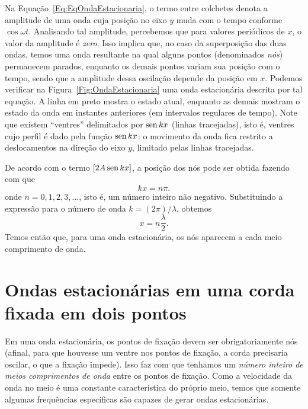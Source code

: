 \pagebreak

Na Equação~\eqref{Eq:EqOndaEstacionaria}, o termo entre colchetes denota a amplitude de uma onda cuja posição no eixo $y$ muda com o tempo conforme $\cos\omega t$. Analisando tal amplitude, percebemos que para valores periódicos de $x$, o valor da amplitude é \emph{zero}. Isso implica que, no caso da superposição das duas ondas, temos uma onda resultante na qual alguns pontos (denominados \emph{nós}) permanecem parados, enquanto os demais pontos variam sua posição com o tempo, sendo que a amplitude dessa oscilação depende da posição em $x$. Podemos verificar na Figura~\ref{Fig:OndaEstacionaria} uma onda estacionária descrita por tal equação. A linha em preto mostra o estado atual, enquanto as demais mostram o estado da onda em instantes anteriores (em intervalos regulares de tempo). Note que existem ``ventres'' delimitados por $\operatorname{sen} kx$ (linhas tracejadas), isto é, ventres cujo perfil é dado pela função $\operatorname{sen} kx$: o movimento da onda fica restrito a deslocamentos na direção do eixo $y$, limitado pelas linhas tracejadas.

De acordo com o termo $[2A\operatorname{sen} kx]$, a posição dos nós pode ser obtida fazendo com que
\begin{equation}
	kx = n\pi.
\end{equation}
%
onde $n = 0, 1, 2, 3, \dots$, isto é, um número inteiro não negativo. Substituindo a expressão para o número de onda $k = (2\pi)/\lambda$, obtemos
\begin{equation}
	x = n \frac{\lambda}{2}.
\end{equation}
%
Temos então que, para uma onda estacionária, os nós aparecem a cada meio comprimento de onda.

\section{Ondas estacionárias em uma corda fixada em dois pontos}

Em uma onda estacionária, os pontos de fixação devem ser obrigatoriamente nós (afinal, para que houvesse um ventre nos pontos de fixação, a corda precisaria oscilar, o que a fixação impede). Isso faz com que tenhamos um \emph{número inteiro de meios comprimentos de onda} entre os pontos de fixação. Como a velocidade da onda no meio é uma constante característica do próprio meio, temos que somente algumas frequências específicas são capazes de gerar ondas estacionárias.

